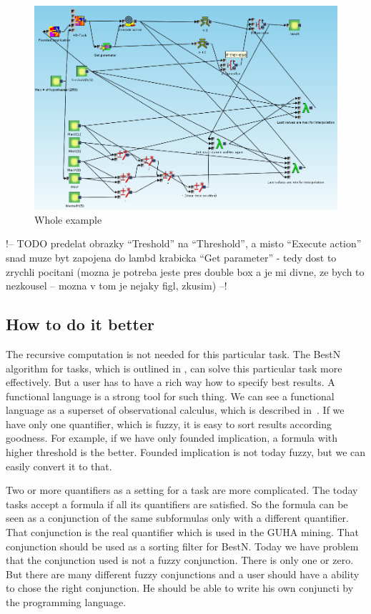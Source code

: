 \documentclass[a4paper,12pt]{book}
\begin{document}
\begin{figure}
	\includegraphics[width=1\textwidth]{exampleResult}
	\caption{Whole example}
	\label{fig:exampleResult}
\end{figure}

!-- TODO predelat obrazky ``Treshold'' na ``Threshold'', a misto ``Execute action'' snad muze byt zapojena do lambd krabicka ``Get parameter'' - tedy dost to zrychli pocitani (mozna je potreba jeste pres double box a je mi divne, ze bych to nezkousel -- mozna v tom je nejaky figl, zkusim) --!

\subsection{How to do it better}
The recursive computation is not needed for this particular task. The BestN algorithm for tasks, which is outlined in \cite{thesisKuchar}, can solve this particular task more effectively. But a user has to have a rich way how to specify best results. A functional language is a strong tool for such thing. We can see a functional language as a superset of observational calculus, which is described in~\cite{GUHAbook}. If we have only one quantifier, which is fuzzy, it is easy to sort results according goodness. For example, if we have only founded implication, a formula with higher threshold is the better. Founded implication is not today fuzzy, but we can easily convert it to that.

Two or more quantifiers as a setting for a task are more complicated. The today tasks accept a formula if all its quantifiers are satisfied. So the formula can be seen as a conjunction of the same subformulas only with a different quantifier. That conjunction is the real quantifier which is used in the GUHA mining. That conjunction should be used as a sorting filter for BestN. Today we have problem that the conjunction used is not a fuzzy conjunction. There is only one or zero. But there are many different fuzzy conjunctions and a user should have a ability to chose the right conjunction. He should be able to write his own conjuncti by the programming language.
\end{document}
